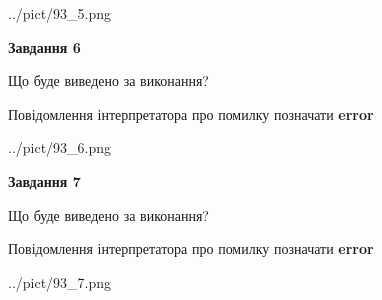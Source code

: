\documentclass[10pt, ukrainian]{article}
\begin{document}
{\begin {large}
\begin{center}
	{../pict/93_5.png}
\end{center}
\newpage

{\begin {center}\textbf{Завдання 6}\end {center}}\par
Що буде виведено за виконання? \par
Повідомлення інтерпретатора про помилку позначати \textbf{error}

\begin{center}
	{../pict/93_6.png}
\end{center}
\newpage

{\begin {center}\textbf{Завдання 7}\end {center}}\par
Що буде виведено за виконання? \par
Повідомлення інтерпретатора про помилку позначати \textbf{error}

\begin{center}
	{../pict/93_7.png}
\end{center}
\newpage

\end {large}}
\end{document}
